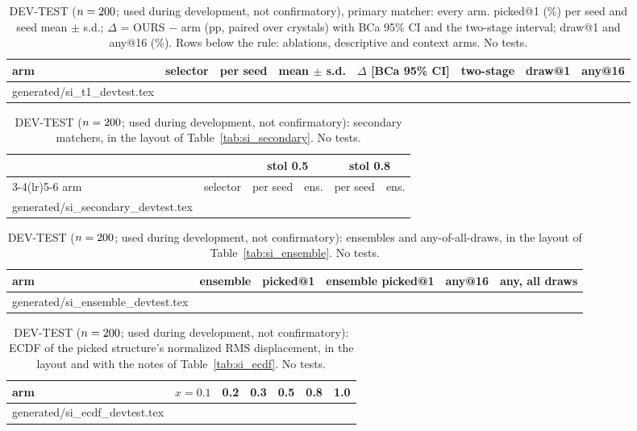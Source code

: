 \documentclass[journal=acsodf,manuscript=article]{achemso}
\makeatletter
\newcommand{\inputrows}[1]{\@@input #1 }
\newcommand{\devlabel}{DEV-TEST ($n=\svNDev$; used during development, not confirmatory)}
\makeatother
\begin{document}
\begin{table}[htbp]
\caption{\devlabel, primary matcher: every arm. picked@1 (\%) per seed and seed mean $\pm$
s.d.; $\Delta$ = OURS $-$ arm (pp, paired over crystals) with BCa 95\% CI and the two-stage
interval; draw@1 and any@16 (\%). Rows below the rule: ablations, descriptive and context arms.
No tests.}
\label{tab:si_dev_t1}
\centering
\scriptsize
\setlength{\tabcolsep}{2.5pt}
\begin{tabular}{@{}llcccccc@{}}
\toprule
arm & selector & per seed & mean $\pm$ s.d. & $\Delta$ [BCa 95\% CI] & two-stage & draw@1 & any@16 \\
\midrule
\inputrows{generated/si_t1_devtest.tex}
\bottomrule
\end{tabular}
\end{table}

\begin{table}[htbp]
\caption{\devlabel: secondary matchers, in the layout of Table~\ref{tab:si_secondary}. No
tests.}
\label{tab:si_dev_secondary}
\centering
\footnotesize
\setlength{\tabcolsep}{3pt}
\begin{tabular}{@{}llcccc@{}}
\toprule
 & & \multicolumn{2}{c}{stol 0.5} & \multicolumn{2}{c}{stol 0.8} \\
\cmidrule(lr){3-4}\cmidrule(lr){5-6}
arm & selector & per seed & ens. & per seed & ens. \\
\midrule
\inputrows{generated/si_secondary_devtest.tex}
\bottomrule
\end{tabular}
\end{table}

\begin{table}[htbp]
\caption{\devlabel: ensembles and any-of-all-draws, in the layout of
Table~\ref{tab:si_ensemble}. No tests.}
\label{tab:si_dev_ensemble}
\centering
\footnotesize
\setlength{\tabcolsep}{3pt}
\begin{tabular}{@{}llcccc@{}}
\toprule
arm & ensemble & picked@1 & ensemble picked@1 & any@16 & any, all draws \\
\midrule
\inputrows{generated/si_ensemble_devtest.tex}
\bottomrule
\end{tabular}
\end{table}

\begin{table}[htbp]
\caption{\devlabel: ECDF of the picked structure's normalized RMS displacement, in the layout and
with the notes of Table~\ref{tab:si_ecdf}. No tests.}
\label{tab:si_dev_ecdf}
\centering
\footnotesize
\begin{tabular}{@{}lcccccc@{}}
\toprule
arm & $x=0.1$ & 0.2 & 0.3 & 0.5 & 0.8 & 1.0 \\
\midrule
\inputrows{generated/si_ecdf_devtest.tex}
\bottomrule
\end{tabular}
\end{table}
\end{document}
